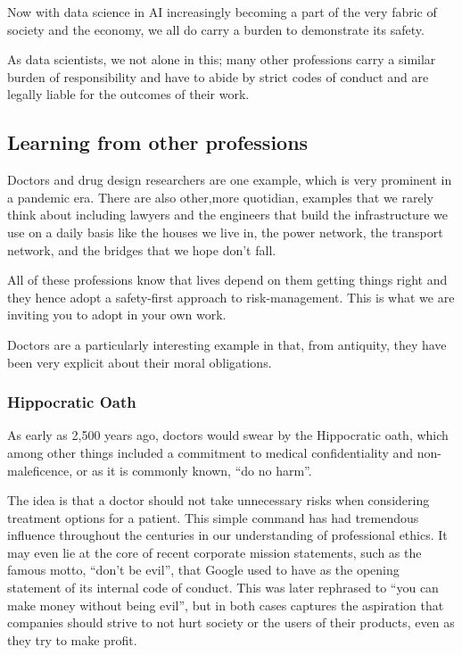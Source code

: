 \documentclass[
]{book}
\theoremstyle{definition}
\theoremstyle{definition}
\theoremstyle{definition}
\theoremstyle{definition}
\theoremstyle{remark}
\begin{document}
Now with data science in AI increasingly becoming a part of the very fabric of society and the economy, we all do carry a burden to demonstrate its safety.

As data scientists, we not alone in this; many other professions carry a similar burden of responsibility and have to abide by strict codes of conduct and are legally liable for the outcomes of their work.

\hypertarget{learning-from-other-professions}{%
\subsection{Learning from other professions}\label{learning-from-other-professions}}

Doctors and drug design researchers are one example, which is very prominent in a pandemic era. There are also other,more quotidian, examples that we rarely think about including lawyers and the engineers that build the infrastructure we use on a daily basis like the houses we live in, the power network, the transport network, and the bridges that we hope don't fall.

All of these professions know that lives depend on them getting things right and they hence adopt a safety-first approach to risk-management. This is what we are inviting you to adopt in your own work.

Doctors are a particularly interesting example in that, from antiquity, they have been very explicit about their moral obligations.

\hypertarget{hippocratic-oath}{%
\subsubsection{Hippocratic Oath}\label{hippocratic-oath}}

As early as 2,500 years ago, doctors would swear by the Hippocratic oath, which among other things included a commitment to medical confidentiality and non-maleficence, or as it is commonly known, ``do no harm''.

The idea is that a doctor should not take unnecessary risks when considering treatment options for a patient. This simple command has had tremendous influence throughout the centuries in our understanding of professional ethics. It may even lie at the core of recent corporate mission statements, such as the famous motto, ``don't be evil'', that Google used to have as the opening statement of its internal code of conduct. This was later rephrased to ``you
can make money without being evil'', but in both cases captures the aspiration that companies should strive to not hurt society or the users of their products, even as they try to make profit.
\end{document}
